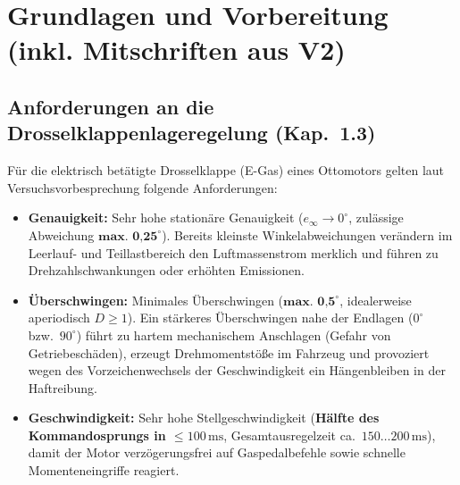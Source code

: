 \documentclass[a4paper,10pt,department=FakEI]{OTHRartcl}
\begin{document}
\vspace{5mm}

\begingroup
\hypersetup{linkcolor=black}
\tableofcontents
\endgroup

\clearpage

\section{Grundlagen und Vorbereitung (inkl. Mitschriften aus V2)}

\subsection{Anforderungen an die Drosselklappenlageregelung (Kap.~1.3)}
Für die elektrisch betätigte Drosselklappe (E-Gas) eines Ottomotors gelten laut Versuchsvorbesprechung folgende Anforderungen:
\begin{itemize}\setlength{\itemsep}{2pt}
    \item \textbf{Genauigkeit:} Sehr hohe stationäre Genauigkeit ($e_{\infty} \to 0^\circ$, zulässige Abweichung $\textbf{max.\ 0,25}^\circ$). Bereits kleinste Winkelabweichungen verändern im Leerlauf- und Teillastbereich den Luftmassenstrom merklich und führen zu Drehzahlschwankungen oder erhöhten Emissionen.
    \item \textbf{Überschwingen:} Minimales Überschwingen ($\textbf{max.\ 0,5}^\circ$, idealerweise aperiodisch $D \ge 1$). Ein stärkeres Überschwingen nahe der Endlagen ($0^\circ$ bzw.\ $90^\circ$) führt zu hartem mechanischem Anschlagen (Gefahr von Getriebeschäden), erzeugt Drehmomentstöße im Fahrzeug und provoziert wegen des Vorzeichenwechsels der Geschwindigkeit ein Hängenbleiben in der Haftreibung.
    \item \textbf{Geschwindigkeit:} Sehr hohe Stellgeschwindigkeit (\textbf{Hälfte des Kommandosprungs in $\le 100\,\text{ms}$}, Gesamtausregelzeit ca.\ $150\dots 200\,\text{ms}$), damit der Motor verzögerungsfrei auf Gaspedalbefehle sowie schnelle Momenteneingriffe reagiert.
\end{itemize}
\end{document}
